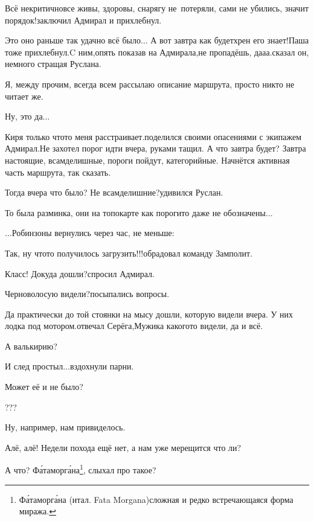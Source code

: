 \diagdash Всё некритично\mdash все живы, здоровы, снарягу не~потеряли, сами не убились, значит порядок!\mdash заключил Адмирал и прихлебнул.

\diagdash Это оно раньше так удачно всё было$\ldots$ А вот завтра как будет\mdash хрен его знает!\mdash Паша тоже прихлебнул.\mdash C ним,\mdash опять показав на Адмирала,\mdash не пропадёшь, да\sdash а\sdash а.\mdash сказал он, немного стращая Руслана.

\diagdash Я, между прочим, всегда всем рассылаю описание маршрута, просто никто не читает же.

\diagdash Ну, это да$\ldots$

\diagdash Киря только что\sdash то меня расстраивает.\mdash поделился своими опасениями с экипажем Адмирал.\mdash Не захотел порог идти вчера, руками тащил. А что завтра будет? Завтра настоящие, всамделишные, пороги пойдут, категорийные. Начнётся активная часть маршрута, так сказать.

\diagdash Тогда вчера что было? Не всамделишние?\mdash удивился Руслан.

\diagdash То была разминка, они на топокарте как пороги\sdash то даже не обозначены$\ldots$

\vspace{0.5cm}
$\ldots$Робинзоны вернулись через час, не меньше:

\diagdash Так, ну что\sdash то получилось загрузить!!!\mdash обрадовал команду Замполит.

\diagdash Класс! Докуда дошли?\mdash спросил Адмирал.

\diagdash Черноволосую видели?\mdash посыпались вопросы.

\diagdash Да практически до той стоянки на мысу дошли, которую видели вчера. У них лодка под мотором.\mdash отвечал Серёга,\mdash Мужика какого\sdash то видели, да и всё.

\diagdash А валькирию?

\diagdash И след простыл$\ldots$\mdash вздохнули парни.

\diagdash Может её и не было?

\diagdash ???

\diagdash Ну, например, нам привиделось.

\diagdash Алё, алё! Недели похода ещё нет, а нам уже мерещится что ли?

\renewcommand*{\thefootnote}{\fnsymbol{footnote}}
\setcounter{footnote}{0}

\diagdash А что? Ф\'ата\sdash морг\'ана\footnote{Ф\'ата\sdash морг\'ана (итал. Fata Morgana)\mdash сложная и редко встречающаяся форма миража.}, слыхал про такое?

